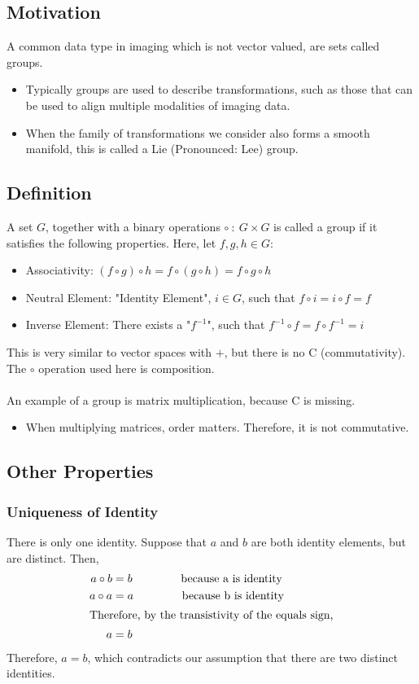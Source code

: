 \documentclass[10pt]{article}
\begin{document}
\subsection*{Motivation}
A common data type in imaging which is not vector valued, are sets called groups.
\begin{itemize}
    \item Typically groups are used to describe transformations, such as those that can be used to align multiple modalities of imaging data.
    \item When the family of transformations we consider also forms a smooth manifold, this is called a Lie (Pronounced: Lee) group.
\end{itemize}
\subsection*{Definition}
A set $G$, together with a binary operations $\circ \::\: G \times G$ is called a group if it satisfies the following properties.  Here, let $f, g, h \in G$:
\begin{itemize}
    \item Associativity: $(f \circ g) \circ h = f \circ (g \circ h) = f \circ g \circ h$
    \item Neutral Element: "Identity Element", $i \in G$, such that $f \circ i = i \circ f = f$
    \item Inverse Element: There exists a "$f^{-1}$", such that $f^{-1} \circ f = f \circ f^{-1} = i$
\end{itemize}
This is very similar to vector spaces with $+$, but there is no C (commutativity).  The $\circ$ operation used here is composition.\\\\
An example of a group is matrix multiplication, because C is missing.
\begin{itemize}
    \item When multiplying matrices, order matters.  Therefore, it is not commutative.
\end{itemize}
\subsection*{Other Properties}
\subsubsection*{Uniqueness of Identity}
There is only one identity.  Suppose that $a$ and $b$ are both identity elements, but are distinct.  Then,
\begin{align*}
    a \circ b &= b \hspace{1.5cm} \text{because a is identity}\\
    a \circ a &= a \hspace{1.5cm} \text{because b is identity}\\
    \intertext{Therefore, by the transistivity of the equals sign,}
    a &= b
\end{align*}
Therefore, $a = b$, which contradicts our assumption that there are two distinct identities.
\end{document}
